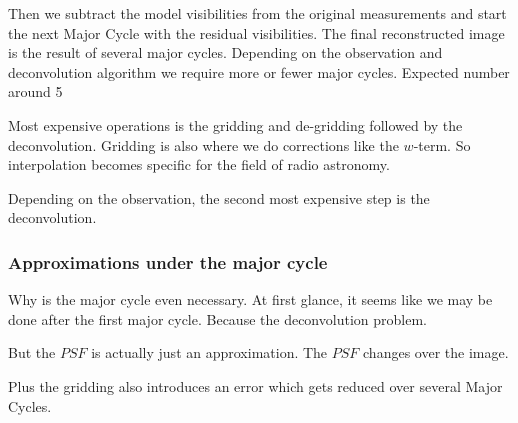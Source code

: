 Then we subtract the model visibilities from the original measurements and start the next Major Cycle with the residual visibilities. The final reconstructed image is the result of several major cycles. Depending on the observation and deconvolution algorithm we require more or fewer major cycles. Expected number around 5

Most expensive operations is the gridding and de-gridding followed by the deconvolution. Gridding is also where we do corrections like the $w$-term. So interpolation becomes specific for the field of radio astronomy.

Depending on the observation, the second most expensive step is the deconvolution.


\subsubsection{Approximations under the major cycle} \label{intro:major:approximations}
Why is the major cycle even necessary. At first glance, it seems like we may be done after the first major cycle. Because the deconvolution problem.

But the $PSF$ is actually just an approximation. The $PSF$ changes over the image.

Plus the gridding also introduces an error which gets reduced over several Major Cycles.